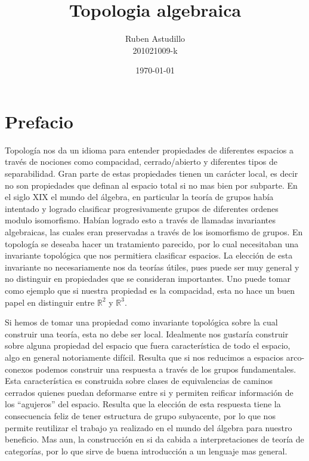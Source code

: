 \documentclass[letterpaper]{article}
\theoremstyle{definition}
\theoremstyle{plain}
\theoremstyle{plain}
\theoremstyle{remark}
\begin{document}
\title{Topologia algebraica}
\author{Ruben Astudillo \\ 201021009-k}
\date{\today}
\maketitle

\section{Prefacio}
Topología nos da un idioma para entender propiedades de diferentes
espacios a través de nociones como compacidad, cerrado/abierto y
diferentes tipos
de separabilidad. Gran parte de estas propiedades tienen un carácter
local, es decir no son propiedades que definan al espacio total si no mas
bien por subparte. En el siglo XIX el mundo del álgebra, en
particular la teoría de grupos había intentado y logrado clasificar
progresivamente grupos de diferentes ordenes modulo isomorfismo. Habían
logrado esto a través de llamadas invariantes algebraicas, las cuales
eran preservadas a través de los isomorfismo de grupos. En topología se
deseaba hacer un tratamiento parecido, por lo cual necesitaban una
invariante topológica que nos permitiera clasificar espacios. La elección
de esta invariante no necesariamente nos da teorías útiles, pues puede
ser muy general y no distinguir en propiedades que se consideran
importantes. Uno puede tomar como ejemplo que si nuestra propiedad es
la compacidad, esta no hace un buen papel en distinguir entre
\(\mathbb{R}^2\) y \(\mathbb{R}^3\).

Si hemos de tomar una propiedad como invariante topológica sobre la cual
construir una teoría, esta no debe ser local. Idealmente nos gustaría
construir sobre alguna propiedad del espacio que fuera característica de
todo el espacio, algo en general notoriamente difícil. Resulta que si nos
reducimos a espacios arco-conexos podemos construir una respuesta a través
de los grupos fundamentales. Esta característica es construida sobre
clases de equivalencias de caminos cerrados quienes puedan deformarse
entre si y permiten reificar información de los ``agujeros'' del espacio.
Resulta que la elección de esta respuesta tiene la consecuencia feliz de
tener estructura de grupo subyacente, por lo que nos permite reutilizar
el trabajo ya realizado en el mundo del álgebra para nuestro beneficio.
Mas aun, la construcción en si da cabida a interpretaciones de
teoría de categorías, por lo que sirve de buena introducción a un
lenguaje mas general.
\end{document}
